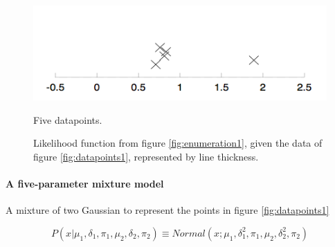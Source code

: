 \documentclass[11pt]{article}
\begin{document}
\begin{figure}[ht]
\begin{minipage}[b]{0.45\linewidth}
\centering
  \includegraphics[width=\textwidth]{Graph/enumeration2.png}
  \caption{Five datapoints.}
  \label{fig:datapoints1}
\end{minipage}
\hspace{0.5cm}
\begin{minipage}[b]{0.45\linewidth}
\centering
  \caption{Likelihood function from figure \ref{fig:enumeration1}, given the data of figure \ref{fig:datapoints1}, represented by line thickness.}
  \label{fig:enumeration3}
\end{minipage}
\end{figure}


\paragraph{A five-parameter mixture model}
A mixture of two Gaussian to represent the points in figure \ref{fig:datapoints1}

\begin{equation}
  P(x | \mu_1, \delta_1, \pi_1, \mu_2, \delta_2, \pi_2) \equiv Normal(x; \mu_1, \delta^2_1, \pi_1, \mu_2, \delta^2_2, \pi_2)
\end{equation}
\end{document}

